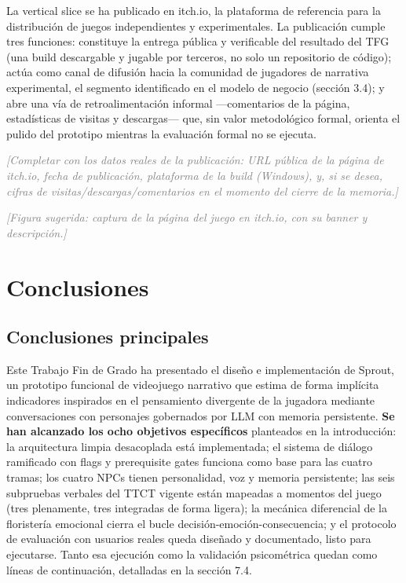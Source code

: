 \documentclass[12pt,twoside,titlepage]{report}
\begin{document}
La vertical slice se ha publicado en itch.io, la plataforma de referencia para la distribución de juegos independientes y experimentales. La publicación cumple tres funciones: constituye la entrega pública y verificable del resultado del TFG (una build descargable y jugable por terceros, no solo un repositorio de código); actúa como canal de difusión hacia la comunidad de jugadores de narrativa experimental, el segmento identificado en el modelo de negocio (sección 3.4); y abre una vía de retroalimentación informal ---comentarios de la página, estadísticas de visitas y descargas--- que, sin valor metodológico formal, orienta el pulido del prototipo mientras la evaluación formal no se ejecuta.

\textcolor{gray}{\textit{[Completar con los datos reales de la publicación: URL pública de la página de itch.io, fecha de publicación, plataforma de la build (Windows), y, si se desea, cifras de visitas/descargas/comentarios en el momento del cierre de la memoria.]}}

\textcolor{gray}{\textit{[Figura sugerida: captura de la página del juego en itch.io, con su banner y descripción.]}}

\chapter{Conclusiones}

\section{Conclusiones principales}

Este Trabajo Fin de Grado ha presentado el diseño e implementación de Sprout, un prototipo funcional de videojuego narrativo que estima de forma implícita indicadores inspirados en el pensamiento divergente de la jugadora mediante conversaciones con personajes gobernados por LLM con memoria persistente. \textbf{Se han alcanzado los ocho objetivos específicos} planteados en la introducción: la arquitectura limpia desacoplada está implementada; el sistema de diálogo ramificado con flags y prerequisite gates funciona como base para las cuatro tramas; los cuatro NPCs tienen personalidad, voz y memoria persistente; las seis subpruebas verbales del TTCT vigente están mapeadas a momentos del juego (tres plenamente, tres integradas de forma ligera); la mecánica diferencial de la floristería emocional cierra el bucle decisión-emoción-consecuencia; y el protocolo de evaluación con usuarios reales queda diseñado y documentado, listo para ejecutarse. Tanto esa ejecución como la validación psicométrica quedan como líneas de continuación, detalladas en la sección 7.4.
\end{document}
